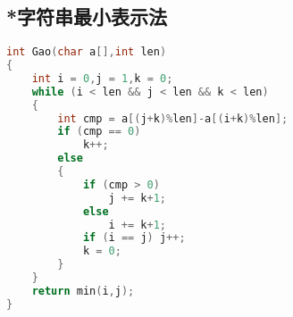 \subsection{*字符串最小表示法}
    \begin{lstlisting}[language=c++]
int Gao(char a[],int len)
{
	int i = 0,j = 1,k = 0;
	while (i < len && j < len && k < len)
	{
		int cmp = a[(j+k)%len]-a[(i+k)%len];
		if (cmp == 0)
			k++;
		else
		{
			if (cmp > 0)
				j += k+1;
			else
				i += k+1;
			if (i == j)	j++;
			k = 0;
		}
	}
	return min(i,j);
}
    \end{lstlisting}